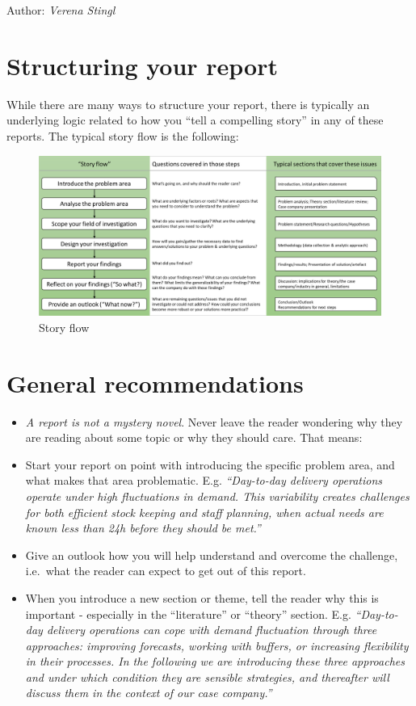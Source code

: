 \documentclass[
]{book}
\begin{document}
Author: \emph{Verena Stingl}

\hypertarget{structuring-your-report}{%
\section{Structuring your report}\label{structuring-your-report}}

While there are many ways to structure your report, there is typically
an underlying logic related to how you ``tell a compelling story'' in
any of these reports. The typical story flow is the following:

\begin{figure}
\centering
\includegraphics{images/story_flow.png}
\caption{Story flow}
\end{figure}

\hypertarget{general-recommendations}{%
\section{General recommendations}\label{general-recommendations}}

\begin{itemize}
\item
  \emph{A report is not a mystery novel}. Never leave the reader wondering
  why they are reading about some topic or why they should care.
  That means:
\item
  Start your report on point with introducing the specific problem
  area, and what makes that area problematic. E.g. \emph{``Day-to-day delivery operations operate under high fluctuations in demand. This variability creates challenges for both efficient stock keeping and staff planning, when actual needs are known less than 24h before they should be met.''}
\item
  Give an outlook how you will help understand and overcome the
  challenge, i.e.~what the reader can expect to get out of this
  report.
\item
  When you introduce a new section or theme, tell the reader why
  this is important - especially in the ``literature'' or
  ``theory'' section. E.g. \emph{``Day-to-day delivery operations can cope with demand fluctuation through three approaches: improving forecasts, working with buffers, or increasing flexibility in their processes. In the following we are introducing these three approaches and under which condition they are sensible strategies, and thereafter will discuss them in the context of our case company.''}
\end{itemize}
\end{document}
